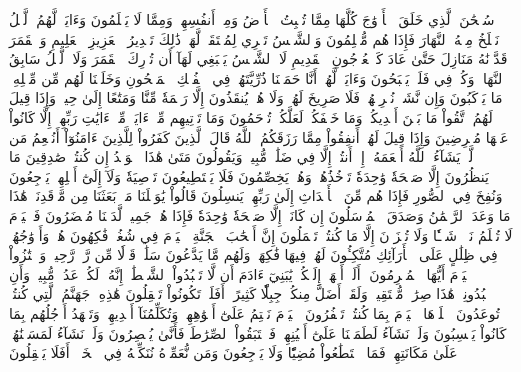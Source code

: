 سُبۡحَٰنَ ٱلَّذِي خَلَقَ ٱلۡأَزۡوَٰجَ كُلَّهَا مِمَّا تُنۢبِتُ ٱلۡأَرۡضُ وَمِنۡ أَنفُسِهِمۡ وَمِمَّا لَا يَعۡلَمُونَ
وَءَايَةٞ لَّهُمُ ٱلَّيۡلُ نَسۡلَخُ مِنۡهُ ٱلنَّهَارَ فَإِذَا هُم مُّظۡلِمُونَ
وَٱلشَّمۡسُ تَجۡرِي لِمُسۡتَقَرّٖ لَّهَاۚ ذَٰلِكَ تَقۡدِيرُ ٱلۡعَزِيزِ ٱلۡعَلِيمِ
وَٱلۡقَمَرَ قَدَّرۡنَٰهُ مَنَازِلَ حَتَّىٰ عَادَ كَٱلۡعُرۡجُونِ ٱلۡقَدِيمِ
لَا ٱلشَّمۡسُ يَنۢبَغِي لَهَآ أَن تُدۡرِكَ ٱلۡقَمَرَ وَلَا ٱلَّيۡلُ سَابِقُ ٱلنَّهَارِۚ وَكُلّٞ فِي فَلَكٖ يَسۡبَحُونَ
وَءَايَةٞ لَّهُمۡ أَنَّا حَمَلۡنَا ذُرِّيَّتَهُمۡ فِي ٱلۡفُلۡكِ ٱلۡمَشۡحُونِ
وَخَلَقۡنَا لَهُم مِّن مِّثۡلِهِۦ مَا يَرۡكَبُونَ
وَإِن نَّشَأۡ نُغۡرِقۡهُمۡ فَلَا صَرِيخَ لَهُمۡ وَلَا هُمۡ يُنقَذُونَ
إِلَّا رَحۡمَةٗ مِّنَّا وَمَتَٰعًا إِلَىٰ حِينٖ
وَإِذَا قِيلَ لَهُمُ ٱتَّقُواْ مَا بَيۡنَ أَيۡدِيكُمۡ وَمَا خَلۡفَكُمۡ لَعَلَّكُمۡ تُرۡحَمُونَ
وَمَا تَأۡتِيهِم مِّنۡ ءَايَةٖ مِّنۡ ءَايَٰتِ رَبِّهِمۡ إِلَّا كَانُواْ عَنۡهَا مُعۡرِضِينَ
وَإِذَا قِيلَ لَهُمۡ أَنفِقُواْ مِمَّا رَزَقَكُمُ ٱللَّهُ قَالَ ٱلَّذِينَ كَفَرُواْ لِلَّذِينَ ءَامَنُوٓاْ أَنُطۡعِمُ مَن لَّوۡ يَشَآءُ ٱللَّهُ أَطۡعَمَهُۥٓ إِنۡ أَنتُمۡ إِلَّا فِي ضَلَٰلٖ مُّبِينٖ
وَيَقُولُونَ مَتَىٰ هَٰذَا ٱلۡوَعۡدُ إِن كُنتُمۡ صَٰدِقِينَ
مَا يَنظُرُونَ إِلَّا صَيۡحَةٗ وَٰحِدَةٗ تَأۡخُذُهُمۡ وَهُمۡ يَخِصِّمُونَ
فَلَا يَسۡتَطِيعُونَ تَوۡصِيَةٗ وَلَآ إِلَىٰٓ أَهۡلِهِمۡ يَرۡجِعُونَ
وَنُفِخَ فِي ٱلصُّورِ فَإِذَا هُم مِّنَ ٱلۡأَجۡدَاثِ إِلَىٰ رَبِّهِمۡ يَنسِلُونَ
قَالُواْ يَٰوَيۡلَنَا مَنۢ بَعَثَنَا مِن مَّرۡقَدِنَاۜۗ هَٰذَا مَا وَعَدَ ٱلرَّحۡمَٰنُ وَصَدَقَ ٱلۡمُرۡسَلُونَ
إِن كَانَتۡ إِلَّا صَيۡحَةٗ وَٰحِدَةٗ فَإِذَا هُمۡ جَمِيعٞ لَّدَيۡنَا مُحۡضَرُونَ
فَٱلۡيَوۡمَ لَا تُظۡلَمُ نَفۡسٞ شَيۡـٔٗا وَلَا تُجۡزَوۡنَ إِلَّا مَا كُنتُمۡ تَعۡمَلُونَ
إِنَّ أَصۡحَٰبَ ٱلۡجَنَّةِ ٱلۡيَوۡمَ فِي شُغُلٖ فَٰكِهُونَ
هُمۡ وَأَزۡوَٰجُهُمۡ فِي ظِلَٰلٍ عَلَى ٱلۡأَرَآئِكِ مُتَّكِـُٔونَ
لَهُمۡ فِيهَا فَٰكِهَةٞ وَلَهُم مَّا يَدَّعُونَ
سَلَٰمٞ قَوۡلٗا مِّن رَّبّٖ رَّحِيمٖ
وَٱمۡتَٰزُواْ ٱلۡيَوۡمَ أَيُّهَا ٱلۡمُجۡرِمُونَ
۞أَلَمۡ أَعۡهَدۡ إِلَيۡكُمۡ يَٰبَنِيٓ ءَادَمَ أَن لَّا تَعۡبُدُواْ ٱلشَّيۡطَٰنَۖ إِنَّهُۥ لَكُمۡ عَدُوّٞ مُّبِينٞ
وَأَنِ ٱعۡبُدُونِيۚ هَٰذَا صِرَٰطٞ مُّسۡتَقِيمٞ
وَلَقَدۡ أَضَلَّ مِنكُمۡ جِبِلّٗا كَثِيرًاۖ أَفَلَمۡ تَكُونُواْ تَعۡقِلُونَ
هَٰذِهِۦ جَهَنَّمُ ٱلَّتِي كُنتُمۡ تُوعَدُونَ
ٱصۡلَوۡهَا ٱلۡيَوۡمَ بِمَا كُنتُمۡ تَكۡفُرُونَ
ٱلۡيَوۡمَ نَخۡتِمُ عَلَىٰٓ أَفۡوَٰهِهِمۡ وَتُكَلِّمُنَآ أَيۡدِيهِمۡ وَتَشۡهَدُ أَرۡجُلُهُم بِمَا كَانُواْ يَكۡسِبُونَ
وَلَوۡ نَشَآءُ لَطَمَسۡنَا عَلَىٰٓ أَعۡيُنِهِمۡ فَٱسۡتَبَقُواْ ٱلصِّرَٰطَ فَأَنَّىٰ يُبۡصِرُونَ
وَلَوۡ نَشَآءُ لَمَسَخۡنَٰهُمۡ عَلَىٰ مَكَانَتِهِمۡ فَمَا ٱسۡتَطَٰعُواْ مُضِيّٗا وَلَا يَرۡجِعُونَ
وَمَن نُّعَمِّرۡهُ نُنَكِّسۡهُ فِي ٱلۡخَلۡقِۚ أَفَلَا يَعۡقِلُونَ
